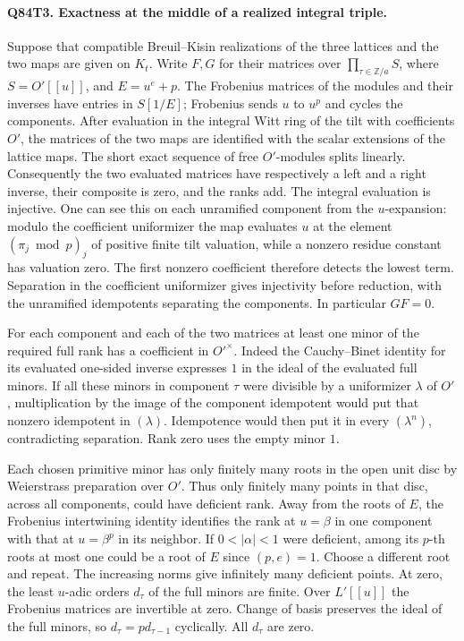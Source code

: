 \paragraph{Q84T3. Exactness at the middle of a realized integral triple.}
Suppose that compatible Breuil--Kisin realizations of the three
lattices and the two maps are given on $K_t$. Write $F,G$ for their
matrices over $\prod_{\tau\in\mathbb Z/a}S$, where $S=O'[[u]]$,
and $E=u^e+p$. The Frobenius matrices of the modules and their
inverses have entries in $S[1/E]$; Frobenius sends $u$ to $u^p$ and
cycles the components. After evaluation in the integral Witt ring
of the tilt with coefficients $O'$, the matrices of the two maps
are identified with the scalar extensions of the lattice maps.
The short exact sequence of free $O'$-modules splits linearly.
Consequently the two evaluated matrices have respectively a left
and a right inverse, their composite is zero, and the ranks add.
The integral evaluation is injective. One can see this on each
unramified component from the $u$-expansion: modulo the coefficient
uniformizer the map evaluates $u$ at the element
$(\pi_j\bmod p)_j$ of positive finite tilt valuation, while a
nonzero residue constant has valuation zero. The first nonzero
coefficient therefore detects the lowest term. Separation in the
coefficient uniformizer gives injectivity before reduction, with
the unramified idempotents separating the components.
In particular $GF=0$.

For each component and each of the two matrices at least one minor
of the required full rank has a coefficient in $O'^\times$.
Indeed the Cauchy--Binet identity for its evaluated one-sided inverse
expresses $1$ in the ideal of the evaluated full minors. If all
these minors in component $\tau$ were divisible by a uniformizer
$\lambda$ of $O'$, multiplication by the image of the component
idempotent would put that nonzero idempotent in $(\lambda)$.
Idempotence would then put it in every $(\lambda^n)$, contradicting
separation. Rank zero uses the empty minor $1$.

Each chosen primitive minor has only finitely many roots in the open
unit disc by Weierstrass preparation over $O'$. Thus only finitely
many points in that disc, across all components, could have deficient
rank. Away from the roots of $E$, the Frobenius intertwining identity
identifies the rank at $u=\beta$ in one component with that at
$u=\beta^p$ in its neighbor. If $0<|\alpha|<1$ were deficient,
among its $p$-th roots at most one could be a root of $E$ since
$(p,e)=1$. Choose a different root and repeat. The increasing norms
give infinitely many deficient points. At zero, the least
$u$-adic orders $d_\tau$ of the full minors are finite.
Over $L'[[u]]$ the Frobenius matrices are invertible at zero.
Change of basis preserves the ideal of the full minors, so
$d_\tau=p d_{\tau-1}$ cyclically. All $d_\tau$ are zero.

